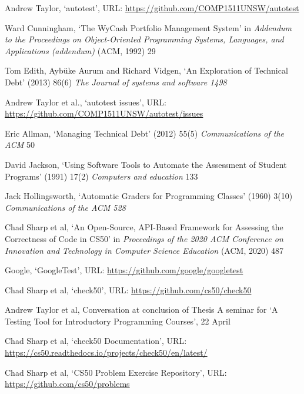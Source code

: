 \documentclass[hidelinks]{report}
\begin{document}
\begin{thebibliography}{99}
	
Andrew Taylor, ‘autotest’, URL: \url{https://github.com/COMP1511UNSW/autotest}

Ward Cunningham, ‘The WyCash Portfolio Management System’ in \textit{Addendum to the Proceedings on Object-Oriented Programming Systems, Languages, and Applications (addendum)} (ACM, 1992) 29

Tom Edith, Aybüke Aurum and Richard Vidgen, ‘An Exploration of Technical Debt’ (2013) 86(6) \textit{The Journal of systems and software 1498}

Andrew Taylor et al., ‘autotest issues’, URL: \url{https://github.com/COMP1511UNSW/autotest/issues}

Eric Allman, ‘Managing Technical Debt’ (2012) 55(5) \textit{Communications of the ACM} 50

David Jackson, ‘Using Software Tools to Automate the Assessment of Student Programs’ (1991) 17(2) \textit{Computers and education} 133

Jack Hollingsworth, ‘Automatic Graders for Programming Classes’ (1960) 3(10) \textit{Communications of the ACM 528}

Chad Sharp et al, ‘An Open-Source, API-Based Framework for Assessing the Correctness of Code in CS50’ in \textit{Proceedings of the 2020 ACM Conference on Innovation and Technology in Computer Science Education} (ACM, 2020) 487

Google, ‘GoogleTest’, URL: \url{https://github.com/google/googletest}

Chad Sharp et al, ‘check50’, URL: \url{https://github.com/cs50/check50}

Andrew Taylor et al, Conversation at conclusion of Thesis A seminar for ‘A Testing Tool for Introductory Programming Courses’, 22 April

Chad Sharp et al, ‘check50 Documentation’, URL: \url{https://cs50.readthedocs.io/projects/check50/en/latest/}

Chad Sharp et al, ‘CS50 Problem Exercise Repository’, URL: \url{https://github.com/cs50/problems}


\end{thebibliography}
\end{document}
